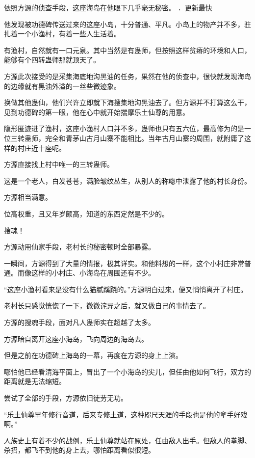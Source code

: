 
\begin{this_body}

依照方源的侦查手段，这座海岛在他眼下几乎毫无秘密。 ．更新最快

他发现被功德碑传送过来的这座小岛，十分普通、平凡。小岛上的物产并不多，驻扎着一个小渔村，有着一些人生活着。

有渔村，自然就有一口元泉。其中当然是有蛊师，但按照这样贫瘠的环境和人口，能够有个四转蛊师那就顶天了。

方源此次接受的是采集海底地沟黑油的任务，果然在他的侦查中，很快就发现海岛的边缘就有黑油外溢的一丝些微迹象。

换做其他蛊仙，他们兴许立即就下海搜集地沟黑油去了。但方源并不打算这么干，见到功德碑的第一眼，他在心中就开始揣摩乐土仙尊的用意。

隐形匿迹进了渔村，这座小渔村人口并不多，蛊师也只有五六位，最高修为的是一位三转蛊师，完全和青茅山古月山寨不能相比。当年古月山寨的周围，就附庸了这样的村庄近十座呢。

方源直接找上村中唯一的三转蛊师。

这是一个老人，白发苍苍，满脸皱纹丛生，从别人的称唿中泄露了他的村长身份。

方源相当满意。

位高权重，且又年岁颇高，知道的东西定然是不少的。

搜魂！

方源动用仙家手段，老村长的秘密顿时全部暴露。

一瞬间，方源得到了大量的情报，极其详实。和他料想的一样，这个小村庄非常普通。而像这样的小村庄、小海岛在周围还有不少。

“这座小渔村看来是没有什么猫腻蹊跷的。”方源明白过来，便又悄悄离开了村庄。

老村长只感觉恍惚了一下，微微诧异之后，就又做自己的事情去了。

方源的搜魂手段，面对凡人蛊师实在超越了太多。

方源暗自离开这座小海岛，飞向周边的海岛去。

但是之前在功德碑上海岛的一幕，再度在方源的身上上演。

哪怕他已经看清海平面上，冒出了一个小海岛的尖儿，但任由他如何飞行，双方的距离就是无法缩短。

尝试了全部的手段，方源依旧徒劳无功。

“乐土仙尊早年修行音道，后来专修土道，这种咫尺天涯的手段也是他的拿手好戏啊。”

人族史上有着不少的战例，乐土仙尊就站在原处，任由敌人出手。但敌人的拳脚、杀招，都飞不到他的身上去，哪怕距离看似很短。


\end{this_body}
